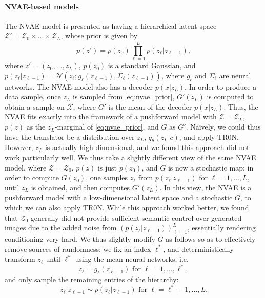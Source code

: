\documentclass[nohyperref]{article}
\theoremstyle{plain}
\theoremstyle{definition}
\theoremstyle{remark}
\begin{document}
\paragraph{NVAE-based models} The NVAE model is presented as having a hierarchical latent space $\mathcal{Z}' = \mathcal{Z}_0 \times \dots \times \mathcal{Z}_L$, whose prior is given by
\begin{equation}\label{eq:nvae_prior}
    p(z') = p(z_0) \displaystyle \prod_{\ell=1}^L p(z_\ell|z_{\ell - 1}),
\end{equation}
where $z'=(z_0,\dots,z_L)$, $p(z_0)$ is a standard Gaussian, and $p(z_\ell|z_{\ell - 1}) = \mathcal{N}(z_\ell; g_\ell(z_{\ell - 1}), \Sigma_\ell(z_{\ell - 1}))$, where $g_\ell$ and $\Sigma_\ell$ are neural networks. The NVAE model also has a decoder $p(x|z_L)$. In order to produce a data sample, once $z_L$ is sampled from \eqref{eq:nvae_prior}, $G'(z_L)$ is computed to obtain a sample on $\mathcal{X}$, where $G'$ is the mean of the decoder $p(x|z_L)$. Thus, the NVAE fits exactly into the framework of a pushforward model with $\mathcal{Z}=\mathcal{Z}_L$, $p(z)$ as the $z_L$-marginal of \eqref{eq:nvae_prior}, and $G$ as $G'$. Na\"ively, we could thus have the translator be a distribution over $z_L$, $q_\theta(z_L|c)$, and apply TR0N. However, $z_L$ is actually high-dimensional, and we found this approach did not work particularly well. We thus take a slightly different view of the same NVAE model, where $\mathcal{Z}=\mathcal{Z}_0$, $p(z)$ is just $p(z_0)$, and $G$ is now a stochastic map: in order to compute $G(z_0)$, one samples $z_{\ell}$ from $p(z_\ell|z_{\ell-1})$ for $\ell=1,\dots,L$, until $z_L$ is obtained, and then computes $G'(z_L)$. In this view, the NVAE is a pushforward model with a low-dimensional latent space and a stochastic $G$, to which we can also apply TR0N. While this approach worked better, we found that $\mathcal{Z}_{0}$ generally did not provide sufficient semantic control over generated images due to the added noise from $(p(z_\ell|z_{\ell - 1}))_{\ell=1}^{L}$, essentially rendering conditioning very hard. We thus slightly modify $G$ as follows so as to effectively remove sources of randomness: we fix an index $\ell^*$, and deterministically transform $z_\ell$ until $\ell^*$ using the mean neural networks, i.e.\
\begin{equation}\label{eq:nvae_z_det}
    z_\ell = g_\ell(z_{\ell-1}) \text{ for }\ell=1,\dots,\ell^*,
\end{equation}
and only sample the remaining entries of the hierarchy:
\begin{equation}\label{eq:nvae_z_rand}
    z_\ell|z_{\ell-1} \sim p(z_\ell|z_{\ell-1}) \text{ for }\ell=\ell^*+1,\dots,L.
\end{equation}
\end{document}
